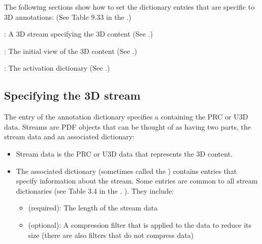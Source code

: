 \documentclass[letterpaper,12pt,english,openany,oneside]{sphinxmanual}
\begin{document}
The following sections show how to set the dictionary entries that are specific to 3D annotations: (See Table 9.33 in the .)

 : A 3D stream specifying the 3D content (See .)

 : The initial view of the 3D content (See .)

 : The activation dictionary (See .)


\subsection{Specifying the 3D stream}
\label{\detokenize{Plugins_3D_samples:specifying-the-3d-stream}}
The  entry of the annotation dictionary specifies a  containing the PRC or U3D data. Streams are PDF objects that can be thought of as having two parts, the stream data and an associated dictionary:
\begin{itemize}
\item {} 
Stream data is the PRC or U3D data that represents the 3D content.

\item {} 
The associated dictionary (sometimes called the  ) contains entries that specify information about the stream. Some entries are common to all stream dictionaries (see Table 3.4 in the . ). They include:
\begin{itemize}
\item {} 
 (required): The length of the stream data

\item {} 
 (optional): A compression filter that is applied to the data to reduce its size (there are also filters that do not compress data)

\end{itemize}

\end{itemize}
\end{document}
